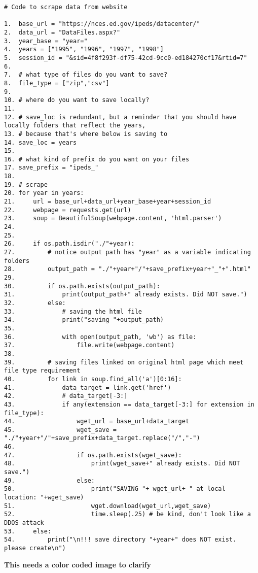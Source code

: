 \documentclass[
]{book}
\begin{document}
\begin{verbatim}
# Code to scrape data from website

1.  base_url = "https://nces.ed.gov/ipeds/datacenter/"
2.  data_url = "DataFiles.aspx?"
3.  year_base = "year="
4.  years = ["1995", "1996", "1997", "1998"]
5.  session_id = "&sid=4f8f293f-df75-42cd-9cc0-ed184270cf17&rtid=7"
6. 
7.  # what type of files do you want to save?
8.  file_type = ["zip","csv"]
9. 
10. # where do you want to save locally?
11. 
12. # save_loc is redundant, but a reminder that you should have locally folders that reflect the years, 
13. # because that's where below is saving to
14. save_loc = years 
15. 
16. # what kind of prefix do you want on your files
17. save_prefix = "ipeds_" 
18. 
19. # scrape
20. for year in years:
21.     url = base_url+data_url+year_base+year+session_id 
22.     webpage = requests.get(url)
23.     soup = BeautifulSoup(webpage.content, 'html.parser')
24. 
25. 
26.     if os.path.isdir("./"+year):
27.         # notice output path has "year" as a variable indicating folders
28.         output_path = "./"+year+"/"+save_prefix+year+"_"+".html"
29.     
30.         if os.path.exists(output_path):
31.             print(output_path+" already exists. Did NOT save.")
32.         else:
33.             # saving the html file
34.             print("saving "+output_path)
35.     
36.             with open(output_path, 'wb') as file:
37.                 file.write(webpage.content) 
38.             
39.         # saving files linked on original html page which meet file type requirement
40.         for link in soup.find_all('a')[0:16]:  
41.             data_target = link.get('href')
42.             # data_target[-3:]
43.             if any(extension == data_target[-3:] for extension in file_type):
44.                 wget_url = base_url+data_target
45.                 wget_save = "./"+year+"/"+save_prefix+data_target.replace("/","-")
46.     
47.                 if os.path.exists(wget_save):
48.                     print(wget_save+" already exists. Did NOT save.")
49.                 else:
50.                     print("SAVING "+ wget_url+ " at local location: "+wget_save)
51.                     wget.download(wget_url,wget_save)
52.                     time.sleep(.25) # be kind, don't look like a DDOS attack
53.     else:
54.         print("\n!!! save directory "+year+" does NOT exist. please create\n")
\end{verbatim}

\textbf{This needs a color coded image to clarify}
\end{document}
